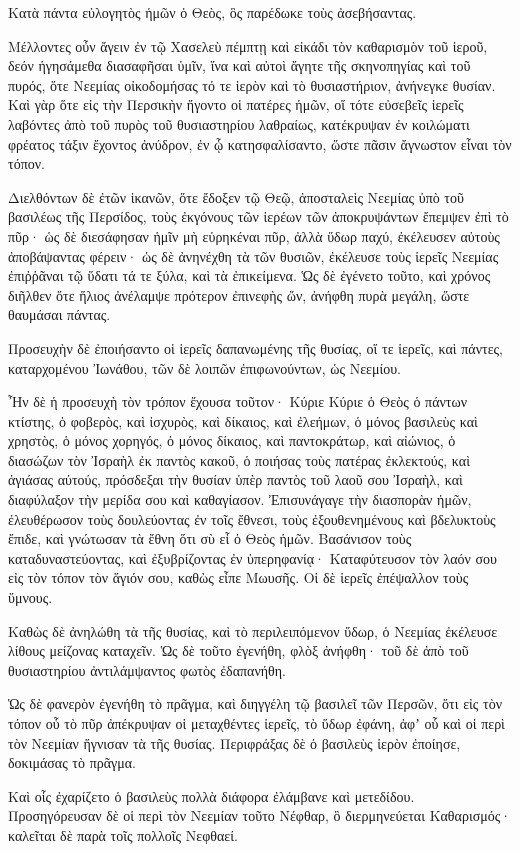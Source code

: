 {\par }{\PP {}Κατὰ πάντα εὐλογητὸς ἡμῶν ὁ Θεὸς, ὃς παρέδωκε τοὺς ἀσεβήσαντας.
\par }{\PP {}Μέλλοντες οὖν ἄγειν ἐν τῷ Χασελεὺ πέμπτῃ καὶ εἰκάδι τὸν καθαρισμὸν τοῦ ἱεροῦ, δεόν ἡγησάμεθα διασαφῆσαι ὑμῖν, ἵνα καὶ αὐτοὶ ἄγητε τῆς σκηνοπηγίας καὶ τοῦ πυρός, ὅτε Νεεμίας οἰκοδομήσας τό τε ἱερὸν καὶ τὸ θυσιαστήριον, ἀνήνεγκε θυσίαν.
Καὶ γὰρ ὅτε εἰς τὴν Περσικὴν ἤγοντο οἱ πατέρες ἡμῶν, οἵ τότε εὐσεβεῖς ἱερεῖς λαβόντες ἀπὸ τοῦ πυρὸς τοῦ θυσιαστηρίου λαθραίως, κατέκρυψαν ἐν κοιλώματι φρέατος τάξιν ἔχοντος ἀνύδρον, ἐν ᾧ κατησφαλίσαντο, ὥστε πᾶσιν ἄγνωστον εἶναι τὸν τόπον.
\par }{\PP {}Διελθόντων δὲ ἐτῶν ἱκανῶν, ὅτε ἔδοξεν τῷ Θεῷ, ἀποσταλεὶς Νεεμίας ὑπὸ τοῦ βασιλέως τῆς Περσίδος, τοὺς ἐκγόνους τῶν ἱερέων τῶν ἀποκρυψάντων ἔπεμψεν ἐπὶ τὸ πῦρ·
ὡς δὲ διεσάφησαν ἡμῖν μὴ εὑρηκέναι πῦρ, ἀλλὰ ὕδωρ παχύ, ἐκέλευσεν αὐτοὺς ἀποβάψαντας φέρειν· ὡς δὲ ἀνηνέχθη τὰ τῶν θυσιῶν, ἐκέλευσε τοὺς ἱερεῖς Νεεμίας ἐπιῤῥᾶναι τῷ ὕδατι τά τε ξύλα, καὶ τὰ ἐπικείμενα.
Ὡς δὲ ἐγένετο τοῦτο, καὶ χρόνος διῆλθεν ὅτε ἥλιος ἀνέλαμψε πρότερον ἐπινεφὴς ὤν, ἀνήφθη πυρὰ μεγάλη, ὥστε θαυμάσαι πάντας.
\par }{\PP {}Προσευχὴν δὲ ἐποιήσαντο οἱ ἱερεῖς δαπανωμένης τῆς θυσίας, οἵ τε ἱερεῖς, καὶ πάντες, καταρχομένου Ἰωνάθου, τῶν δὲ λοιπῶν ἐπιφωνούντων, ὡς Νεεμίου.
\par }{\PP {}Ἦν δὲ ἡ προσευχὴ τὸν τρόπον ἔχουσα τοῦτον· Κύριε Κύριε ὁ Θεὸς ὁ πάντων κτίστης, ὁ φοβερὸς, καὶ ἰσχυρὸς, καὶ δίκαιος, καὶ ἐλεήμων, ὁ μόνος βασιλεὺς καὶ χρηστὸς,
ὁ μόνος χορηγός, ὁ μόνος δίκαιος, καὶ παντοκράτωρ, καὶ αἰώνιος, ὁ διασώζων τὸν Ἰσραὴλ ἐκ παντὸς κακοῦ, ὁ ποιήσας τοὺς πατέρας ἐκλεκτούς, καὶ ἁγιάσας αὐτούς,
πρόσδεξαι τὴν θυσίαν ὑπὲρ παντὸς τοῦ λαοῦ σου Ἰσραὴλ, καὶ διαφύλαξον τὴν μερίδα σου καὶ καθαγίασον.
Ἐπισυνάγαγε τὴν διασπορὰν ἡμῶν, ἐλευθέρωσον τοὺς δουλεύοντας ἐν τοῖς ἔθνεσι, τοὺς ἐξουθενημένους καὶ βδελυκτοὺς ἔπιδε, καὶ γνώτωσαν τὰ ἔθνη ὅτι σὺ εἶ ὁ Θεὸς ἡμῶν.
Βασάνισον τοὺς καταδυναστεύοντας, καὶ ἐξυβρίζοντας ἐν ὑπερηφανίᾳ·
Καταφύτευσον τὸν λαόν σου εἰς τὸν τόπον τὸν ἅγιόν σου, καθὼς εἶπε Μωυσῆς.
Οἱ δὲ ἱερεῖς ἐπέψαλλον τοὺς ὕμνους.
\par }{\PP {}Καθὼς δὲ ἀνηλώθη τὰ τῆς θυσίας, καὶ τὸ περιλειπόμενον ὕδωρ, ὁ Νεεμίας ἐκέλευσε λίθους μείζονας καταχεῖν.
Ὡς δὲ τοῦτο ἐγενήθη, φλὸξ ἀνήφθη· τοῦ δὲ ἀπὸ τοῦ θυσιαστηρίου ἀντιλάμψαντος φωτὸς ἐδαπανήθη.
\par }{\PP {}Ὡς δὲ φανερὸν ἐγενήθη τὸ πρᾶγμα, καὶ διηγγέλη τῷ βασιλεῖ τῶν Περσῶν, ὅτι εἰς τὸν τόπον οὗ τὸ πῦρ ἀπέκρυψαν οἱ μεταχθέντες ἱερεῖς, τὸ ὕδωρ ἐφάνη, ἀφʼ οὗ καὶ οἱ περὶ τὸν Νεεμίαν ἥγνισαν τὰ τῆς θυσίας.
Περιφράξας δὲ ὁ βασιλεὺς ἱερὸν ἐποίησε, δοκιμάσας τὸ πρᾶγμα.
\par }{\PP {}Καὶ οἷς ἐχαρίζετο ὁ βασιλεὺς πολλὰ διάφορα ἐλάμβανε καὶ μετεδίδου.
Προσηγόρευσαν δὲ οἱ περὶ τὸν Νεεμίαν τοῦτο Νέφθαρ, ὃ διερμηνεύεται Καθαρισμός· καλεῖται δὲ παρὰ τοῖς πολλοῖς Νεφθαεί.

}

